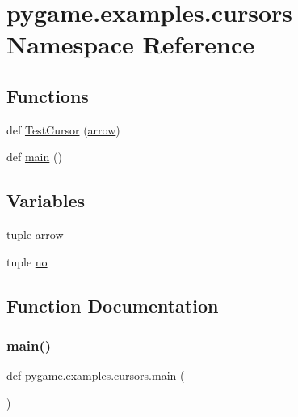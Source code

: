 \hypertarget{namespacepygame_1_1examples_1_1cursors}{}\section{pygame.\+examples.\+cursors Namespace Reference}
\label{namespacepygame_1_1examples_1_1cursors}
\subsection*{Functions}
\begin{DoxyCompactItemize}
\item 
def \hyperlink{namespacepygame_1_1examples_1_1cursors_a6a583d782eceed441ab9774b5a9eb157}{Test\+Cursor} (\hyperlink{namespacepygame_1_1examples_1_1cursors_ab1e25cc27e2af6b0f3453b127b1eeaef}{arrow})
\item 
def \hyperlink{namespacepygame_1_1examples_1_1cursors_a669c777dd6fdf81e010c045777aaf5c0}{main} ()
\end{DoxyCompactItemize}
\subsection*{Variables}
\begin{DoxyCompactItemize}
\item 
tuple \hyperlink{namespacepygame_1_1examples_1_1cursors_ab1e25cc27e2af6b0f3453b127b1eeaef}{arrow}
\item 
tuple \hyperlink{namespacepygame_1_1examples_1_1cursors_a68ec3367d4e4c59119c700e29444b9cc}{no}
\end{DoxyCompactItemize}


\subsection{Function Documentation}
\mbox{\label{namespacepygame_1_1examples_1_1cursors_a669c777dd6fdf81e010c045777aaf5c0}} 
\subsubsection{\texorpdfstring{main()}{main()}}
{\footnotesize\ttfamily def pygame.\+examples.\+cursors.\+main (\begin{DoxyParamCaption}{ }\end{DoxyParamCaption})}

